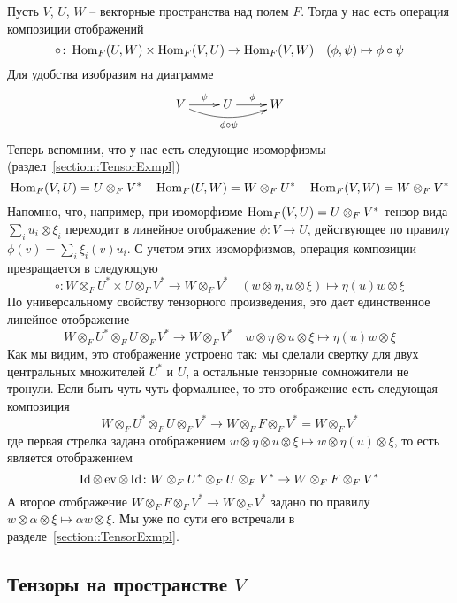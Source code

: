 Пусть $V$, $U$, $W$ -- векторные пространства над полем $F$. Тогда у нас есть операция композиции отображений
\[
\circ \colon \operatorname{Hom}_F(U,W)\times \operatorname{Hom}_F(V, U)\to \operatorname{Hom}_F(V, W)\quad (\phi, \psi)\mapsto \phi\circ \psi
\]
Для удобства изобразим на диаграмме
\[
\xymatrix{
	{V}\ar[r]^{\psi}\ar@/_10pt/[rr]_{\phi\circ\psi}&{U}\ar[r]^{\phi}&{W}
}
\]
Теперь вспомним, что у нас есть следующие изоморфизмы (раздел~\ref{section::TensorExmpl})
\[
\operatorname{Hom}_F(V, U)= U\otimes_F V^*\quad \operatorname{Hom}_F(U, W) = W\otimes_F U^*\quad\operatorname{Hom}_F(V, W) = W\otimes_F V^*
\]
Напомню, что, например, при изоморфизме $\operatorname{Hom}_F(V, U)= U\otimes_F V^*$ тензор вида $\sum_i u_i\otimes \xi_i$ переходит в линейное отображение $\phi\colon V\to U$, действующее по правилу $\phi(v) = \sum_i \xi_i(v)u_i$. С учетом этих изоморфизмов, операция композиции превращается в следующую
\[
\circ\colon W\otimes_F U^* \times U\otimes_F V^* \to W\otimes_F V^*\quad (w\otimes \eta, u\otimes \xi)\mapsto \eta(u) w\otimes \xi
\]
По универсальному свойству тензорного произведения, это дает единственное линейное отображение
\[
W\otimes_F U^* \otimes_F U\otimes_F V^* \to W\otimes_F V^*\quad w\otimes \eta\otimes u\otimes \xi\mapsto \eta(u) w\otimes \xi
\]
Как мы видим, это отображение устроено так: мы сделали свертку для двух центральных множителей $U^*$ и $U$, а остальные тензорные сомножители не тронули. Если быть чуть-чуть формальнее, то это отображение есть следующая композиция
\[
W\otimes_F U^* \otimes_F U \otimes_F V^* \to W\otimes_F F\otimes_F V^* = W\otimes_F V^*
\]
где первая стрелка задана отображением $ w\otimes \eta\otimes u\otimes \xi\mapsto  w\otimes \eta(u)\otimes \xi$, то есть является отображением
\[
\operatorname{Id}\otimes \operatorname{ev}\otimes \operatorname{Id} \colon W\otimes_F U^* \otimes_F U \otimes_F V^* \to W\otimes_F F\otimes_F V^*
\]
А второе отображение $W\otimes_F F\otimes_F V^* \to W\otimes_F V^*$ задано по правилу $w\otimes \alpha \otimes \xi \mapsto \alpha w\otimes \xi$. Мы уже по сути его встречали в разделе~\ref{section::TensorExmpl}.

\subsection{Тензоры на пространстве $V$}


